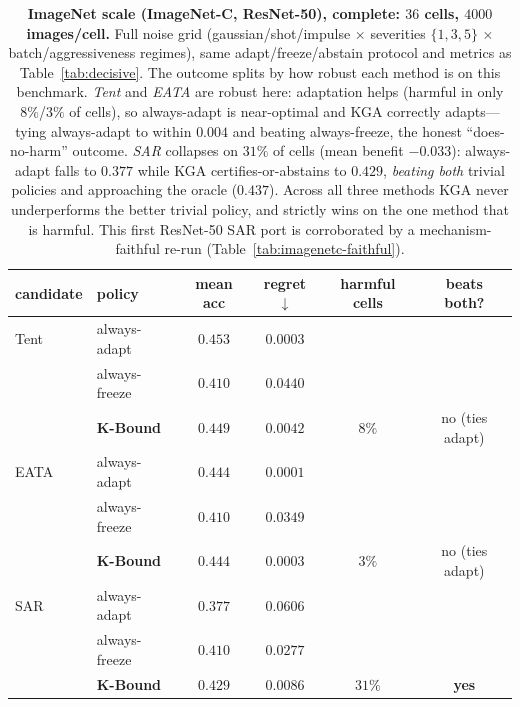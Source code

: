 \documentclass[conference]{IEEEtran}
\theoremstyle{plain}
\theoremstyle{definition}
\begin{document}
\begin{table}[t]\centering\small
\begin{tabular}{llcccc}
\toprule
candidate & policy & mean acc & regret$\downarrow$ & harmful cells & beats both? \\
\midrule
Tent & always-adapt     & $\mathbf{0.453}$ & $0.0003$ &        & \\
     & always-freeze    & $0.410$          & $0.0440$ &        & \\
     & \textbf{K-Bound} & $0.449$          & $0.0042$ & $8\%$  & no (ties adapt) \\
\midrule
EATA & always-adapt     & $\mathbf{0.444}$ & $0.0001$ &        & \\
     & always-freeze    & $0.410$          & $0.0349$ &        & \\
     & \textbf{K-Bound} & $0.444$          & $0.0003$ & $3\%$  & no (ties adapt) \\
\midrule
SAR  & always-adapt     & $0.377$          & $0.0606$ &        & \\
     & always-freeze    & $0.410$          & $0.0277$ &        & \\
     & \textbf{K-Bound} & $\mathbf{0.429}$ & $\mathbf{0.0086}$ & $31\%$ & \textbf{yes} \\
\bottomrule
\end{tabular}
\caption{\textbf{ImageNet scale (ImageNet-C, ResNet-50), complete: $36$ cells, $4000$ images/cell.}
Full noise grid (gaussian/shot/impulse $\times$ severities $\{1,3,5\}$ $\times$ batch/aggressiveness
regimes), same adapt/freeze/abstain protocol and metrics as Table~\ref{tab:decisive}. The outcome
splits by how robust each method is on this benchmark. \emph{Tent} and \emph{EATA} are robust here:
adaptation helps (harmful in only $8\%$/$3\%$ of cells), so always-adapt is near-optimal and
\textsc{KGA} correctly adapts---tying always-adapt to within $0.004$ and beating always-freeze, the
honest ``does-no-harm'' outcome. \emph{SAR} collapses on $31\%$ of cells (mean benefit $-0.033$):
always-adapt falls to $0.377$ while \textsc{KGA} certifies-or-abstains to $0.429$, \emph{beating
both} trivial policies and approaching the oracle ($0.437$). Across all three methods \textsc{KGA}
never underperforms the better trivial policy, and strictly wins on the one method that is harmful.
This first ResNet-50 SAR port is corroborated by a mechanism-faithful re-run
(Table~\ref{tab:imagenetc-faithful}).}
\label{tab:imagenetc}
\end{table}
\end{document}
